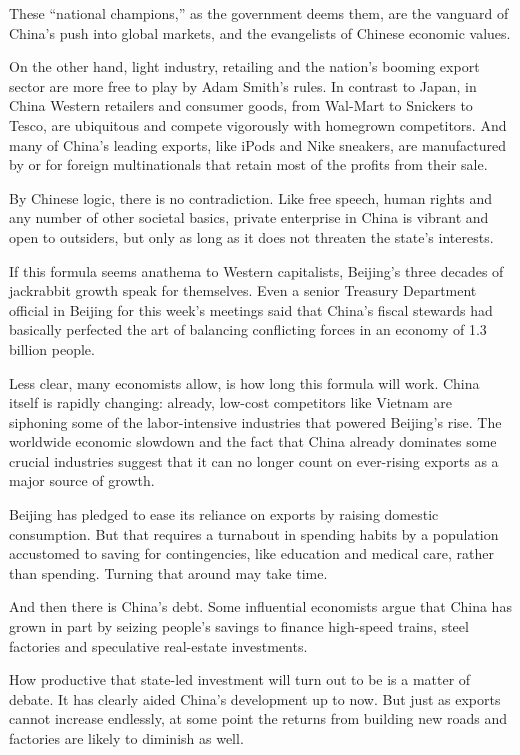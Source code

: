 ﻿\documentclass[12pt]{article}
\begin{document}
These ``national champions,'' as the government deems them, are the vanguard of China's push into
global markets, and the evangelists of Chinese economic values.

On the other hand, light industry, retailing and the nation's booming export sector are more free to
play by Adam Smith's rules. In contrast to Japan, in China Western retailers and consumer goods,
from Wal-Mart to Snickers to Tesco, are ubiquitous and compete vigorously with homegrown
competitors. And many of China's leading exports, like iPods and Nike sneakers, are manufactured by
or for foreign multinationals that retain most of the profits from their sale.

By Chinese logic, there is no contradiction. Like free speech, human rights and any number of other
societal basics, private enterprise in China is vibrant and open to outsiders, but only as long as
it does not threaten the state's interests.

If this formula seems anathema to Western capitalists, Beijing's three decades of jackrabbit growth
speak for themselves. Even a senior Treasury Department official in Beijing for this week's meetings
said that China's fiscal stewards had basically perfected the art of balancing conflicting forces in
an economy of 1.3 billion people.

Less clear, many economists allow, is how long this formula will work. China itself is rapidly
changing: already, low-cost competitors like Vietnam are siphoning some of the labor-intensive
industries that powered Beijing's rise. The worldwide economic slowdown and the fact that China
already dominates some crucial industries suggest that it can no longer count on ever-rising exports
as a major source of growth.

Beijing has pledged to ease its reliance on exports by raising domestic consumption. But that
requires a turnabout in spending habits by a population accustomed to saving for contingencies, like
education and medical care, rather than spending. Turning that around may take time.

And then there is China's debt. Some influential economists argue that China has grown in part by
seizing people's savings to finance high-speed trains, steel factories and speculative real-estate
investments.

How productive that state-led investment will turn out to be is a matter of debate. It has clearly
aided China's development up to now. But just as exports cannot increase endlessly, at some point
the returns from building new roads and factories are likely to diminish as well.
\end{document}

